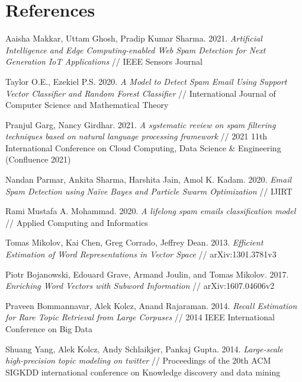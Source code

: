 \documentclass[12pt]{jpconf}
\begin{document}
\section*{References}
\begin{thebibliography}{99}
Aaisha Makkar, Uttam Ghosh, Pradip Kumar Sharma.
2021. \emph{Artificial Intelligence and Edge Computing-enabled
	Web Spam Detection for Next Generation IoT
	Applications} // IEEE Sensors Journal

Taylor O.E., Ezekiel P.S.
2020. \emph{A Model to Detect Spam Email Using Support Vector Classifier and Random Forest Classifier} //
International Journal of Computer Science and Mathematical Theory

Pranjul Garg, Nancy Girdhar.
2021. \emph{A systematic review on spam filtering techniques based on
natural language processing framework} // 2021 11th International Conference on Cloud Computing, Data Science \& Engineering (Confluence 2021)

Nandan Parmar, Ankita Sharma, Harshita Jain, Amol K. Kadam.
2020. \emph{Email Spam Detection using Naïve Bayes and Particle Swarm Optimization} // IJIRT

Rami Mustafa A. Mohammad.
2020. \emph{A lifelong spam emails 	classification model} //
Applied Computing and Informatics

Tomas Mikolov, Kai Chen, Greg Corrado, Jeffrey Dean.
2013. \emph{Efficient Estimation of Word Representations in Vector Space} //
arXiv:1301.3781v3

Piotr Bojanowski, Edouard Grave, Armand Joulin, and Tomas Mikolov.
2017. \emph{Enriching Word Vectors with Subword Information} //
arXiv:1607.04606v2

Praveen Bommannavar, Alek Kolcz, Anand Rajaraman.
2014. \emph{Recall Estimation for Rare Topic Retrieval from Large Corpuses} //
2014 IEEE International Conference on Big Data

Shuang Yang, Alek Kolcz, Andy Schlaikjer, Pankaj Gupta.
2014. \emph{Large-scale high-precision topic modeling on twitter} // Proceedings of the 20th ACM SIGKDD international conference on Knowledge discovery and data mining

\end{thebibliography}
\end{document}
